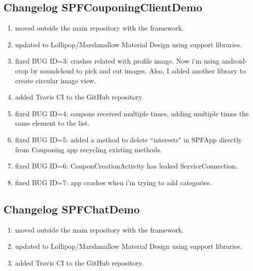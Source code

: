 \subsection*{Changelog SPFCouponingClientDemo}
\begin{enumerate}
	\item moved outside the main repository with the framework.
	\item updated to Lollipop/Marshmallow Material Design using support libraries.
	\item fixed BUG ID=3: crashes related with profile image. Now i'm using android-crop by soundcloud to pick and cut images. Also, I added another library to create circular image view.	
	\item added Travis CI to the GitHub repository.
	\item fixed BUG ID=4: coupons received multiple times, adding multiple times the same element to the list.
	\item fixed BUG ID=5: added a method to delete ``interests" in SPFApp directly from Couponing app recycling existing methods.
	\item fixed BUG ID=6: CouponCreationActivity has leaked ServiceConnection.
	\item fixed BUG ID=7: app crashes when i'm trying to add categories.
\end{enumerate}

\subsection*{Changelog SPFChatDemo}
\begin{enumerate}
	\item moved outside the main repository with the framework.
	\item updated to Lollipop/Marshmallow Material Design using support libraries.	
	\item added Travis CI to the GitHub repository.
\end{enumerate}
